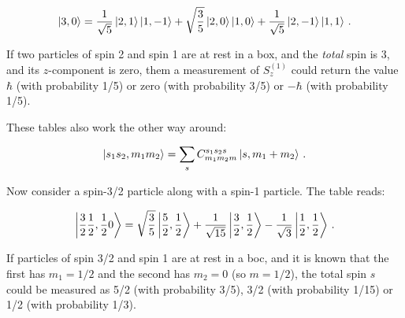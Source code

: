 \documentclass[12pt, titlepage]{article}
\begin{document}
\begin{equation*}
	\ket{3,0} = \frac{1}{\sqrt{5}}\ket{2,1}\ket{1,-1} + \sqrt{\frac{3}{5}}\ket{2,0}\ket{1,0} + \frac{1}{\sqrt{5}}\ket{2,-1}\ket{1,1} \,.
\end{equation*}

If two particles of spin 2 and spin 1 are at rest in a box, and the \emph{total} spin is 3, and its $z$-component is zero, them a measurement of $S_z^{(1)}$ could return the value $\hbar$ (with probability 1/5) or zero (with probability 3/5) or $-\hbar$ (with probability 1/5).

These tables also work the other way around:

\begin{equation}
	\ket{s_1s_2,m_1m_2} = \sum_{s}C_{m_1m_2m}^{s_1s_2s}\ket{s,m_1+m_2} \,.
\end{equation}

Now consider a spin-3/2 particle along with a spin-1 particle. The table reads:

\begin{equation}
	\ket{\frac{3}{2}\frac{1}{2}, \frac{1}{2}0} = \sqrt{\frac{3}{5}}\ket{\frac{5}{2},\frac{1}{2}} + \frac{1}{\sqrt{15}}\ket{\frac{3}{2},\frac{1}{2}} - \frac{1}{\sqrt{3}}\ket{\frac{1}{2},\frac{1}{2}} \,.
\end{equation}

If particles of spin 3/2 and spin 1 are at rest in a boc, and it is known that the first has $m_1=1/2$ and the second has $m_2=0$ (so $m=1/2$), the total spin $s$ could be measured as 5/2 (with probability 3/5), 3/2 (with probability 1/15) or 1/2 (with probability 1/3).
\end{document}
